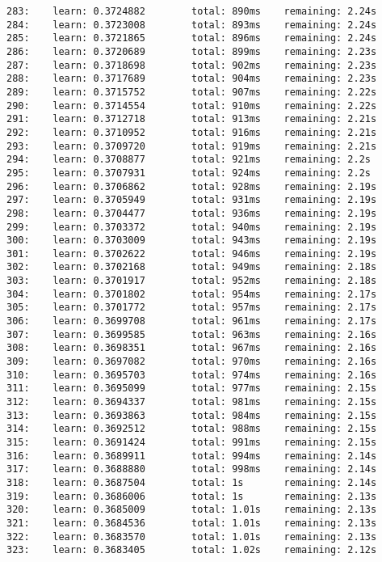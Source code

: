 \documentclass[11pt]{article}
\begin{document}
\begin{Verbatim}[commandchars=\\\{\}]
283:    learn: 0.3724882        total: 890ms    remaining: 2.24s
284:    learn: 0.3723008        total: 893ms    remaining: 2.24s
285:    learn: 0.3721865        total: 896ms    remaining: 2.24s
286:    learn: 0.3720689        total: 899ms    remaining: 2.23s
287:    learn: 0.3718698        total: 902ms    remaining: 2.23s
288:    learn: 0.3717689        total: 904ms    remaining: 2.23s
289:    learn: 0.3715752        total: 907ms    remaining: 2.22s
290:    learn: 0.3714554        total: 910ms    remaining: 2.22s
291:    learn: 0.3712718        total: 913ms    remaining: 2.21s
292:    learn: 0.3710952        total: 916ms    remaining: 2.21s
293:    learn: 0.3709720        total: 919ms    remaining: 2.21s
294:    learn: 0.3708877        total: 921ms    remaining: 2.2s
295:    learn: 0.3707931        total: 924ms    remaining: 2.2s
296:    learn: 0.3706862        total: 928ms    remaining: 2.19s
297:    learn: 0.3705949        total: 931ms    remaining: 2.19s
298:    learn: 0.3704477        total: 936ms    remaining: 2.19s
299:    learn: 0.3703372        total: 940ms    remaining: 2.19s
300:    learn: 0.3703009        total: 943ms    remaining: 2.19s
301:    learn: 0.3702622        total: 946ms    remaining: 2.19s
302:    learn: 0.3702168        total: 949ms    remaining: 2.18s
303:    learn: 0.3701917        total: 952ms    remaining: 2.18s
304:    learn: 0.3701802        total: 954ms    remaining: 2.17s
305:    learn: 0.3701772        total: 957ms    remaining: 2.17s
306:    learn: 0.3699708        total: 961ms    remaining: 2.17s
307:    learn: 0.3699585        total: 963ms    remaining: 2.16s
308:    learn: 0.3698351        total: 967ms    remaining: 2.16s
309:    learn: 0.3697082        total: 970ms    remaining: 2.16s
310:    learn: 0.3695703        total: 974ms    remaining: 2.16s
311:    learn: 0.3695099        total: 977ms    remaining: 2.15s
312:    learn: 0.3694337        total: 981ms    remaining: 2.15s
313:    learn: 0.3693863        total: 984ms    remaining: 2.15s
314:    learn: 0.3692512        total: 988ms    remaining: 2.15s
315:    learn: 0.3691424        total: 991ms    remaining: 2.15s
316:    learn: 0.3689911        total: 994ms    remaining: 2.14s
317:    learn: 0.3688880        total: 998ms    remaining: 2.14s
318:    learn: 0.3687504        total: 1s       remaining: 2.14s
319:    learn: 0.3686006        total: 1s       remaining: 2.13s
320:    learn: 0.3685009        total: 1.01s    remaining: 2.13s
321:    learn: 0.3684536        total: 1.01s    remaining: 2.13s
322:    learn: 0.3683570        total: 1.01s    remaining: 2.13s
323:    learn: 0.3683405        total: 1.02s    remaining: 2.12s

\end{Verbatim}
\end{document}
